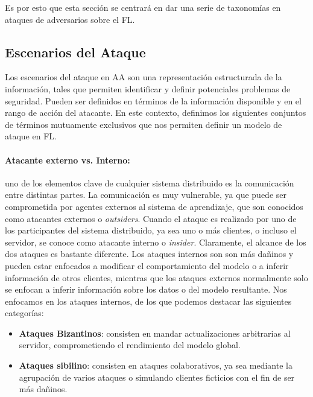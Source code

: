 \begin{itemize}
    Es por esto que esta sección se centrará en dar una serie de taxonomías en ataques de adversarios sobre el \ac{FL}.

    \subsection{Escenarios del Ataque}
    Los escenarios del ataque en \ac{AA} son una representación estructurada de la información, tales que permiten identificar y definir potenciales problemas de seguridad. Pueden ser definidos en términos de la información disponible y en el rango de acción del atacante. En este contexto, definimos los siguientes conjuntos de términos mutuamente exclusivos que nos permiten definir un modelo de ataque en \ac{FL}.

        \paragraph{Atacante externo vs. Interno:} uno de los elementos clave de cualquier sistema distribuido es la comunicación entre distintas partes. La comunicación es muy vulnerable, ya que puede ser comprometida por agentes externos al sistema de aprendizaje, que son conocidos como atacantes externos o \textit{outsiders}. Cuando el ataque es realizado por uno de los participantes del sistema distribuido, ya sea uno o más clientes, o incluso el servidor, se conoce como atacante interno o \textit{insider}. Claramente, el alcance de los dos ataques es bastante diferente. Los ataques internos son son más dañinos y pueden estar enfocados a modificar el comportamiento del modelo o a inferir información de otros clientes, mientras que los ataques externos normalmente solo se enfocan a inferir información sobre los datos o del modelo resultante. Nos enfocamos en los ataques internos, de los que podemos destacar las siguientes categorías:
        \begin{itemize}
            \item \textbf{Ataques Bizantinos}: consisten en mandar actualizaciones arbitrarias al servidor, comprometiendo el rendimiento del modelo global.
            \item \textbf{Ataques sibilino}: consisten en ataques colaborativos, ya sea mediante la agrupación de varios ataques o simulando clientes ficticios con el fin de ser más dañinos.
        \end{itemize}
        

\end{itemize}
